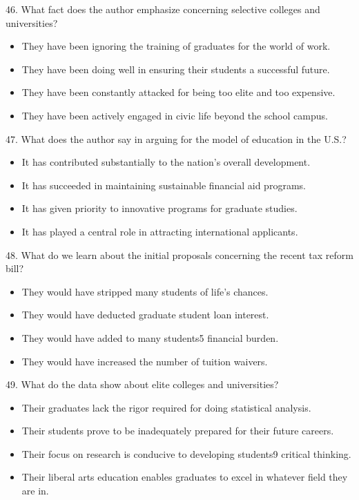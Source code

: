 \documentclass[UTF8,11pt]{ctexart}
\begin{document}
46. What fact does the author emphasize concerning selective colleges and universities?


\begin{itemize}[leftmargin=2em,itemsep=.2em,topsep=.4em]\item[A.] They have been ignoring the training of graduates for the world of work.
\item[B.] They have been doing well in ensuring their students a successful future.
\item[C.] They have been constantly attacked for being too elite and too expensive.
\item[D.] They have been actively engaged in civic life beyond the school campus.
\end{itemize}

47. What does the author say in arguing for the model of education in the U.S.?


\begin{itemize}[leftmargin=2em,itemsep=.2em,topsep=.4em]\item[A.] It has contributed substantially to the nation's overall development.
\item[B.] It has succeeded in maintaining sustainable financial aid programs.
\item[C.] It has given priority to innovative programs for graduate studies.
\item[D.] It has played a central role in attracting international applicants.
\end{itemize}

48. What do we learn about the initial proposals concerning the recent tax reform bill?


\begin{itemize}[leftmargin=2em,itemsep=.2em,topsep=.4em]\item[A.] They would have stripped many students of life's chances.
\item[B.] They would have deducted graduate student loan interest.
\item[C.] They would have added to many students5 financial burden.
\item[D.] They would have increased the number of tuition waivers.
\end{itemize}

49. What do the data show about elite colleges and universities?


\begin{itemize}[leftmargin=2em,itemsep=.2em,topsep=.4em]\item[A.] Their graduates lack the rigor required for doing statistical analysis.
\item[B.] Their students prove to be inadequately prepared for their future careers.
\item[C.] Their focus on research is conducive to developing students9 critical thinking.
\item[D.] Their liberal arts education enables graduates to excel in whatever field they are in.
\end{itemize}
\end{document}
